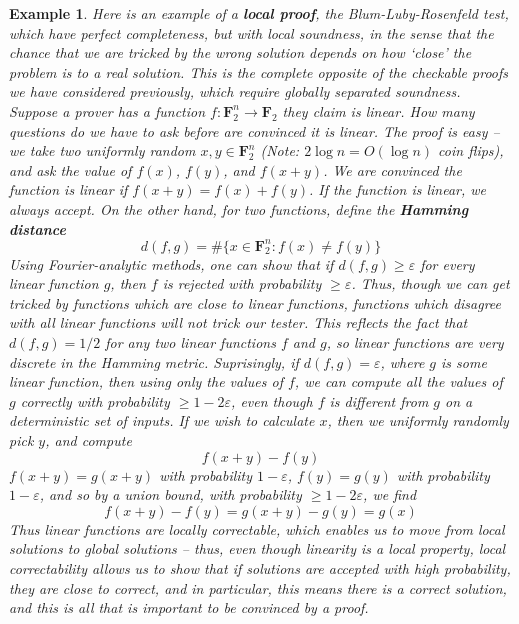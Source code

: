 \documentclass{article}
\theoremstyle{plain}
\newtheorem*{example}{Example}
\theoremstyle{definition}
\begin{document}
\begin{example}
    Here is an example of a {\bf local proof}, the Blum-Luby-Rosenfeld test, which have perfect completeness, but with local soundness, in the sense that the chance that we are tricked by the wrong solution depends on how `close' the problem is to a real solution. This is the complete opposite of the checkable proofs we have considered previously, which require globally separated soundness. Suppose a prover has a function $f: \mathbf{F}_2^n \to \mathbf{F}_2$ they claim is linear. How many questions do we have to ask before are convinced it is linear. The proof is easy -- we take two uniformly random $x,y \in \mathbf{F}_2^n$ (Note: $2 \log n = O(\log n)$ coin flips), and ask the value of $f(x)$, $f(y)$, and $f(x + y)$. We are convinced the function is linear if $f(x+y) = f(x) + f(y)$. If the function is linear, we always accept. On the other hand, for two functions, define the {\bf Hamming distance}
    \[ d(f,g) = \# \{ x \in \mathbf{F}_2^n: f(x) \neq f(y) \} \]
    Using Fourier-analytic methods, one can show that if $d(f,g) \geq \varepsilon$ for {\it every} linear function $g$, then $f$ is rejected with probability $\geq \varepsilon$. Thus, though we can get tricked by functions which are close to linear functions, functions which disagree with all linear functions will not trick our tester. This reflects the fact that $d(f,g) = 1/2$ for any two linear functions $f$ and $g$, so linear functions are very discrete in the Hamming metric. Suprisingly, if $d(f,g) = \varepsilon$, where $g$ is some linear function, then using only the values of $f$, we can compute all the values of $g$ correctly with probability $\geq 1 - 2\varepsilon$, even though $f$ is different from $g$ on a deterministic set of inputs. If we wish to calculate $x$, then we uniformly randomly pick $y$, and compute
    \[ f(x + y) - f(y) \]
    $f(x + y) = g(x + y)$ with probability $1 - \varepsilon$, $f(y) = g(y)$ with probability $1 - \varepsilon$, and so by a union bound, with probability $\geq 1 - 2\varepsilon$, we find
    \[ f(x + y) - f(y) = g(x + y) - g(y) = g(x) \]
    Thus linear functions are locally correctable, which enables us to move from local solutions to global solutions -- thus, even though linearity is a local property, local correctability allows us to show that if solutions are accepted with high probability, they are close to correct, and in particular, this means there {\it is} a correct solution, and this is all that is important to be convinced by a proof.
\end{example}
\end{document}
